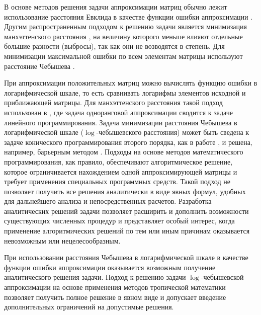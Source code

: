 \documentclass[specialist,
               substylefile = spbu.rtx,
               subf,href,colorlinks=true, 12pt]{disser}
\theoremstyle{definition}
\begin{document}
В основе методов решения задачи аппроксимации матриц обычно лежит использование расстояния Евклида в качестве функции ошибки аппроксимации \cite{Saaty1993Prinyatie,Srebro2003Weighted, Shen2008Sparse,Feldman2015MoreConstraints}. 
Другим распространенным подходом к решению задачи является минимизация манхэттенского расстояния \cite{Chandrasekaran2011Rank,Kyrillidis2018Simple}, на величину которого меньше влияют отдельные большие разности (выбросы), так как они не возводятся в степень.  
Для минимизации максимальной ошибки по всем элементам матрицы используют расстояние Чебышева \cite{Kyrillidis2018Simple,Gillis2019LowRank}.


При аппроксимации положительных матриц можно вычислять функцию ошибки в логарифмической шкале, то есть сравнивать логарифмы элементов исходной и приближающей матрицы. Для манхэттенского расстояния такой подход использован в \cite{Panyukov2018Approximation}, где задача одноранговой аппроксимации сводится к задаче линейного программирования. 
Задача минимизации расстояния Чебышева в логарифмической шкале ($\log$-че\-бы\-шевско\-го расстояния) может быть сведена к задаче конического программирования второго порядка, как в работе \cite{Lobo1998Applications}, и решена, например, барьерным методом \cite{Boyd2004Convex}.
Подходы на основе методов математического программирования, как правило, обеспечивают алгоритмическое решение, которое ограничивается  нахождением одной аппроксимирующей матрицы и требует применения специальных программных средств. Такой подход не позволяет получить все решения аналитически в виде явных формул, удобных для дальнейшего анализа и непосредственных расчетов. 
Разработка аналитических решений задачи позволяет расширить и дополнить возможности существующих численных процедур и
представляет особый интерес, когда применение алгоритмических решений по тем или иным причинам оказывается невозможным или нецелесообразным.

При использовании расстояния Чебышева в логарифмической шкале в качестве функции ошибки аппроксимации оказывается возможным получение аналитического решения задачи.
Подход к решению задачи $\log$-чебышевской аппроксимации 
на основе применения методов тропической математики позволяет получить полное решение в явном виде и допускает введение дополнительных ограничений на допустимые решения.
\end{document}
